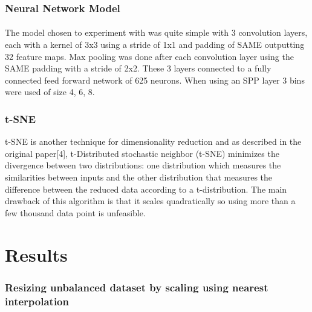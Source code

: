 \documentclass{article}
\begin{document}
\subsubsection{Neural Network Model}
\paragraph{}
The model chosen to experiment with was quite simple with 3 convolution layers, each with a kernel of 3x3 using a stride of 1x1 and padding of SAME outputting 32 feature maps. Max pooling was done after each convolution layer using the SAME padding with a stride of 2x2.  These 3 layers connected to a fully connected feed forward network of 625 neurons. When using an SPP layer 3 bins were used of size 4, 6, 8.

\subsubsection{t-SNE}
t-SNE is another technique for dimensionality reduction and as described in the original paper[4], t-Distributed stochastic neighbor (t-SNE) minimizes the divergence between two distributions: one distribution which measures the similarities between inputs and the other distribution that measures the difference between the reduced data according to a t-distribution. The main drawback of this algorithm is that it scales quadratically so using more than a few thousand data point is unfeasible. 

\paragraph{}

\section{Results}

\begin{minipage}[c]{\textwidth}

\subsubsection{Resizing unbalanced dataset by scaling using nearest interpolation}



\end{minipage}
\end{document}
